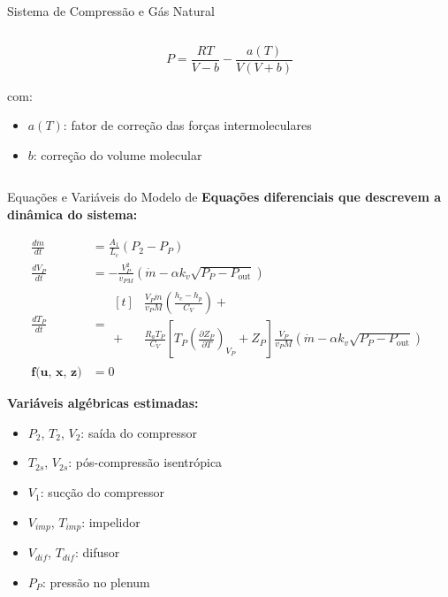 \begin{frame}{Sistema de Compressão e Gás Natural}
\begin{columns}[T]
\begin{column}{0.52\textwidth}
            \[
            P = \frac{R T}{V - b} - \frac{a(T)}{V(V + b)}
            \]

            com:
            \begin{itemize}
                \item \( a(T) \): fator de correção das forças intermoleculares
                \item \( b \): correção do volume molecular
            \end{itemize}
        \end{column}
    \end{columns}
\end{frame}



\begin{frame}{Equações e Variáveis do Modelo de \cite{Meira2022} }
    \scriptsize
    \textbf{Equações diferenciais que descrevem a dinâmica do sistema:}

    \begin{multicols}{2}
    \begin{align}
        \frac{d\dot{m}}{dt} &= \frac{A_1}{L_c}(P_2 - P_P) \tag{1} \\
        \frac{dV_P}{dt} &= -\frac{V_P^2}{v_{PM}} \left( \dot{m} - \alpha k_v \sqrt{P_P - P_{\text{out}}} \right) \tag{2} \\
        \frac{dT_P}{dt} &= 
        \begin{aligned}[t]
            &\frac{V_P \dot{m}}{v_P M} \left( \frac{h_c - h_p}{C_V} \right) + \\
            + &\frac{R_a T_P}{C_V} \left[ T_P \left( \frac{\partial Z_P}{\partial T} \right)_{V_P} + Z_P \right]
            \frac{V_P}{v_P M} \left( \dot{m} - \alpha k_v \sqrt{P_P - P_{\text{out}}} \right)
        \end{aligned} \tag{3} \\
        \textbf{f(u, x, z)} &= 0 \tag{4}
    \end{align}

    \columnbreak
    \begin{minipage}{\linewidth}
        \raggedleft
        \textbf{Variáveis algébricas estimadas:}
        \begin{itemize}
            \item \( P_2 \), \( T_2 \), \( V_2 \): saída do compressor
            \item \( T_{2s} \), \( V_{2s} \): pós-compressão isentrópica
            \item \( V_1 \): sucção do compressor
            \item \( V_{imp} \), \( T_{imp} \): impelidor
            \item \( V_{dif} \), \( T_{dif} \): difusor
            \item \( P_P \): pressão no plenum
        \end{itemize}
    \end{minipage}
    \end{multicols}
\end{frame}

